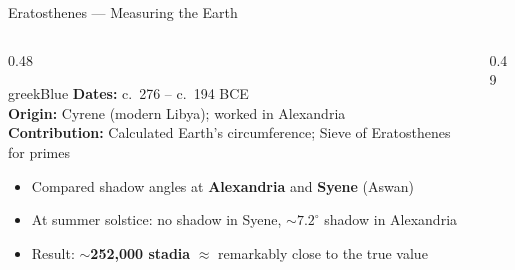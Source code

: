 \begin{frame}[shrink=3]{Eratosthenes --- Measuring the Earth}

  \begin{columns}[T]
    \begin{column}{0.48\textwidth}
      \begin{personbox}{greekBlue}
        \small
        \textbf{Dates:} c.\ 276 -- c.\ 194 BCE\\
        \textbf{Origin:} Cyrene (modern Libya); worked in Alexandria\\
        \textbf{Contribution:} Calculated Earth's circumference; Sieve of Eratosthenes for primes
      \end{personbox}

      \vspace{0.4em}
      \begin{itemize}
        \item Compared shadow angles at \textbf{Alexandria} and \textbf{Syene} (Aswan)
        \item At summer solstice: no shadow in Syene, $\sim 7.2^{\circ}$ shadow in Alexandria
        \item Result: $\sim$\textbf{252,000 stadia} $\approx$ remarkably close to the true value
      \end{itemize}
    \end{column}

    \begin{column}{0.49\textwidth}
    \end{column}
  \end{columns}

\end{frame}

